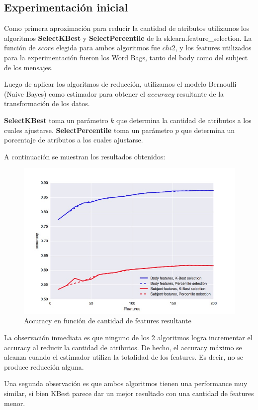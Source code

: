 \subsection{Experimentación inicial}

Como primera aproximación para reducir la cantidad de atributos utilizamos los algoritmos \textbf{SelectKBest} y \textbf{SelectPercentile} de
la sklearn.feature\_selection. La función de \( score \) elegida para ambos algoritmos fue \( chi2 \), y los features utilizados para la
experimentación fueron los Word Bags, tanto del body como del subject de los mensajes.

Luego de aplicar los algoritmos de reducción, utilizamos el modelo Bernoulli (Naive Bayes) como estimador para obtener el \( accuracy \) resultante
de la transformación de los datos.

\textbf{SelectKBest} toma un parámetro \( k \) que determina la cantidad de atributos a los cuales ajustarse.
\textbf{SelectPercentile} toma un parámetro \( p \) que determina un porcentaje de atributos a los cuales ajustarse.

A continuación se muestran los resultados obtenidos:

\begin{figure}
	\centerline{\includegraphics[scale=0.4]{figures/bernoulli_reduced_dimensionality.jpg}}
	\caption{Accuracy en función de cantidad de features resultante}
\end{figure}

La observación inmediata es que ninguno de los 2 algoritmos logra incrementar el accuracy al reducir la cantidad de atributos. De hecho, el accuracy máximo
se alcanza cuando el estimador utiliza la totalidad de los features. Es decir, no se produce reducción alguna.

Una segunda observación es que ambos algoritmos tienen una performance muy similar, si bien KBest parece dar un mejor resultado con una cantidad
de features menor.
